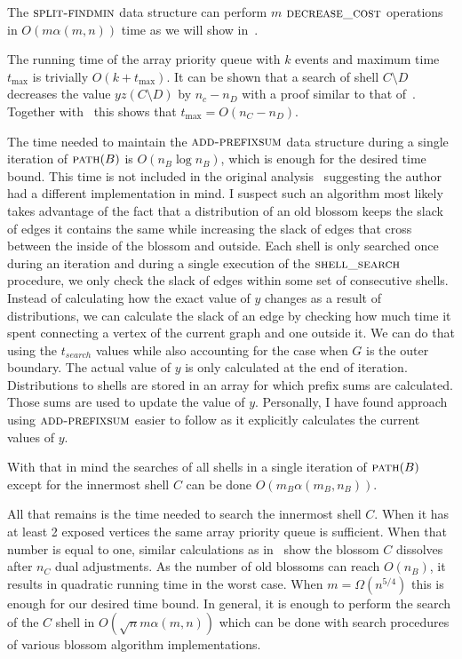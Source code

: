 The $\textsc{split-findmin}$ data structure can perform $m$ $\textsc{decrease\_cost}$ operations in $O(m\alpha(m,n))$ time as we will show in~.

The running time of the array priority queue with $k$ events and maximum time $t_{\max}$ is trivially $O(k + t_{\max})$. It can be shown that a search of shell $C \setminus D$ decreases the value $yz(C \setminus D)$ by $n_c - n_D$ with a proof similar to that of~. Together with~ this shows that $t_{\max} = O(n_C - n_D)$. 

The time needed to maintain the $\textsc{add-prefixsum}$ data structure during a single iteration of $\textsc{path}(B)$ is $O(n_B \log n_B)$, which is enough for the desired time bound. This time is not included in the original analysis~\cite{gabow1984scaling} suggesting the author had a different implementation in mind. I suspect such an algorithm most likely takes advantage of the fact that a distribution of an old blossom keeps the slack of edges it contains the same while increasing the slack of edges that cross between the inside of the blossom and outside. Each shell is only searched once during an iteration and during a single execution of the $\textsc{shell\_search}$ procedure, we only check the slack of edges within some set of consecutive shells. Instead of calculating how the exact value of $y$ changes as a result of distributions, we can calculate the slack of an edge by checking how much time it spent connecting a vertex of the current graph and one outside it. We can do that using the $t_{search}$ values while also accounting for the case when $G$ is the outer boundary. The actual value of $y$ is only calculated at the end of iteration. Distributions to shells are stored in an array for which prefix sums are calculated. Those sums are used to update the value of $y$. Personally, I have found approach using $\textsc{add-prefixsum}$ easier to follow as it explicitly calculates the current values of $y$.

With that in mind the searches of all shells in a single iteration of $\textsc{path}(B)$ except for the innermost shell $C$ can be done $O(m_B \alpha(m_B, n_B))$. 

All that remains is the time needed to search the innermost shell $C$. When it has at least 2 exposed vertices the same array priority queue is sufficient. When that number is equal to one, similar calculations as in~ show the blossom $C$ dissolves after $n_C$ dual adjustments. As the number of old blossoms can reach $O(n_B)$, it results in quadratic running time in the worst case. When $m = \Omega(n^{5/4})$ this is enough for our desired time bound. In general, it is enough to perform the search of the $C$ shell in $O(\sqrt{n}m \alpha(m,n))$ which can be done with search procedures of various blossom algorithm implementations.

